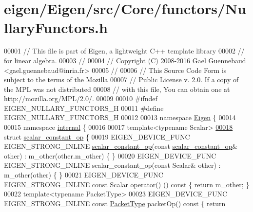 \hypertarget{eigen_2_eigen_2src_2_core_2functors_2_nullary_functors_8h_source}{}\section{eigen/\+Eigen/src/\+Core/functors/\+Nullary\+Functors.h}
\label{eigen_2_eigen_2src_2_core_2functors_2_nullary_functors_8h_source}

\begin{DoxyCode}
00001 \textcolor{comment}{// This file is part of Eigen, a lightweight C++ template library}
00002 \textcolor{comment}{// for linear algebra.}
00003 \textcolor{comment}{//}
00004 \textcolor{comment}{// Copyright (C) 2008-2016 Gael Guennebaud <gael.guennebaud@inria.fr>}
00005 \textcolor{comment}{//}
00006 \textcolor{comment}{// This Source Code Form is subject to the terms of the Mozilla}
00007 \textcolor{comment}{// Public License v. 2.0. If a copy of the MPL was not distributed}
00008 \textcolor{comment}{// with this file, You can obtain one at http://mozilla.org/MPL/2.0/.}
00009 
00010 \textcolor{preprocessor}{#ifndef EIGEN\_NULLARY\_FUNCTORS\_H}
00011 \textcolor{preprocessor}{#define EIGEN\_NULLARY\_FUNCTORS\_H}
00012 
00013 \textcolor{keyword}{namespace }\hyperlink{namespace_eigen}{Eigen} \{
00014 
00015 \textcolor{keyword}{namespace }\hyperlink{namespaceinternal}{internal} \{
00016 
00017 \textcolor{keyword}{template}<\textcolor{keyword}{typename} Scalar>
\hyperlink{struct_eigen_1_1internal_1_1scalar__constant__op}{00018} \textcolor{keyword}{struct }\hyperlink{struct_eigen_1_1internal_1_1scalar__constant__op}{scalar\_constant\_op} \{
00019   EIGEN\_DEVICE\_FUNC EIGEN\_STRONG\_INLINE \hyperlink{struct_eigen_1_1internal_1_1scalar__constant__op}{scalar\_constant\_op}(\textcolor{keyword}{const} 
      \hyperlink{struct_eigen_1_1internal_1_1scalar__constant__op}{scalar\_constant\_op}& other) : m\_other(other.m\_other) \{ \}
00020   EIGEN\_DEVICE\_FUNC EIGEN\_STRONG\_INLINE scalar\_constant\_op(\textcolor{keyword}{const} Scalar& other) : m\_other(other) \{ \}
00021   EIGEN\_DEVICE\_FUNC EIGEN\_STRONG\_INLINE \textcolor{keyword}{const} Scalar operator() ()\textcolor{keyword}{ const }\{ \textcolor{keywordflow}{return} m\_other; \}
00022   \textcolor{keyword}{template}<\textcolor{keyword}{typename} PacketType>
00023   EIGEN\_DEVICE\_FUNC EIGEN\_STRONG\_INLINE \textcolor{keyword}{const} \hyperlink{struct_eigen_1_1_packet_type}{PacketType} packetOp()\textcolor{keyword}{ const }\{ \textcolor{keywordflow}{return} 

\end{DoxyCode}
